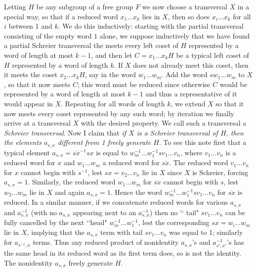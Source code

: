 \documentclass[10pt]{article}
\begin{document}
Letting $H$ be any subgroup of a free group $F$ we now choose a
transversal $X$ in a special way, so that if a reduced word $x_1\ldots
x_k$ lies in $X$, then so does $x_i\ldots x_k$ for all $i$ between 1 and
$k$. We do this inductively: starting with the partial transversal
consisting of the empty word $1$ alone, we suppose inductively that we
have found a partial Schreier transversal the meets every left coset of
$H$ represented by a word of length at most $k-1$, and then let
$C=x_1\ldots x_kH$ be a typical left coset of $H$ represented by a word
of length $k$. If $X$ does not already meet this coset, then it meets
the coset $x_2\ldots x_kH$, say in the word $w_1\ldots w_m$. Add the
word $sw_1\ldots w_m$ to $X$, so that it now meets $C$; this word must
be reduced since otherwise $C$ would be represented by a word of length
at most $k-1$ and thus a representative of it would appear in $X$.
Repeating for all words of length $k$, we extend $X$ so that it now
meets every coset represented by any such word; by iteration we finally
arrive at a transversal $X$ with the desired property. We call such a
transversal a {\sl Schreier transversal}. Now I claim that {\sl if $X$
  is a Schreier transversal of $H$, then the elements $a_{s,x}$
  different from 1 freely generate $H$}. To see this note first that a
typical element $a_{s,x} = \overline{sx}^{-1} sx$ is equal to
$w_m^{-1}\ldots w_1^{-1} s v_1\ldots v_n$, where $v_1\ldots v_n$ is a
reduced word for $x$ and $w_1\ldots w_m$ a reduced word for
$\overline{sx}$. The reduced word $v_1\ldots v_n$ for $x$ cannot begin
with $s^{-1}$, lest $sx = v_2\ldots v_n$ lie in $X$ since $X$ is
Schreier, forcing $a_{s,x} = 1$. Similarly, the reduced word $w_1\ldots
w_m$ for $\overline{sx}$ cannot begin with $s$, lest $w_2\ldots w_m$ lie
in $X$ and again $a_{s,x} = 1$. Hence the word $w_m^{-1}\ldots w_1^{-1}
s v_1\ldots v_n$ for $\overline{sx}$ is reduced. In a similar manner, if
we concatenate reduced words for various $a_{s,x}$ and $a_{s,x}^{-1}$
(with no $a_{s,x}$ appearing next to an $a_{s,x}^{-1}$) then no \lq\lq
tail" $s v_1\ldots v_n$ can be fully cancelled by the next \lq\lq head"
$w_m^{-1}\ldots w_1^{-1}$, lest the corresponding $sx = w_i\ldots w_m$
lie in $X$, implying that the $a_{s,x}$ term with tail $s v_1\ldots v_n$
was equal to 1; similarly for $a_{s^{-1},x}$ terms. Thus any reduced
product of nonidentity $a_{s,x}$'s and $a_{s',x'}^{-1}$'s has the same
head in its reduced word as its first term does, so is not the identity.
The nonidentity $a_{s,x}$ freely generate $H$.
\end{document}
